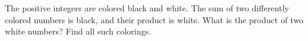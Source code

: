 The positive integers are colored black and white. The sum of two differently colored numbers is black, and their product is white. What is the product of two white numbers? Find all such colorings.
